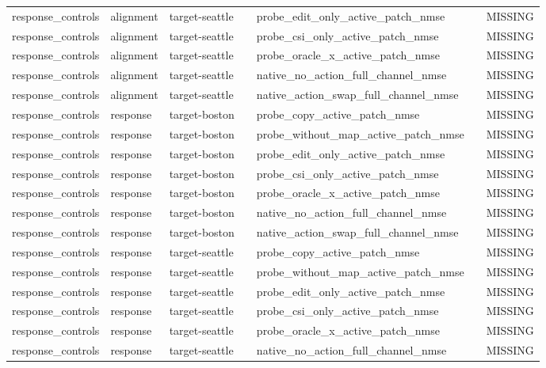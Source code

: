 \begin{longtable}{lllllll}
response\_controls & alignment & target-seattle &  & probe\_edit\_only\_active\_patch\_nmse &  & MISSING \\
response\_controls & alignment & target-seattle &  & probe\_csi\_only\_active\_patch\_nmse &  & MISSING \\
response\_controls & alignment & target-seattle &  & probe\_oracle\_x\_active\_patch\_nmse &  & MISSING \\
response\_controls & alignment & target-seattle &  & native\_no\_action\_full\_channel\_nmse &  & MISSING \\
response\_controls & alignment & target-seattle &  & native\_action\_swap\_full\_channel\_nmse &  & MISSING \\
response\_controls & response & target-boston &  & probe\_copy\_active\_patch\_nmse &  & MISSING \\
response\_controls & response & target-boston &  & probe\_without\_map\_active\_patch\_nmse &  & MISSING \\
response\_controls & response & target-boston &  & probe\_edit\_only\_active\_patch\_nmse &  & MISSING \\
response\_controls & response & target-boston &  & probe\_csi\_only\_active\_patch\_nmse &  & MISSING \\
response\_controls & response & target-boston &  & probe\_oracle\_x\_active\_patch\_nmse &  & MISSING \\
response\_controls & response & target-boston &  & native\_no\_action\_full\_channel\_nmse &  & MISSING \\
response\_controls & response & target-boston &  & native\_action\_swap\_full\_channel\_nmse &  & MISSING \\
response\_controls & response & target-seattle &  & probe\_copy\_active\_patch\_nmse &  & MISSING \\
response\_controls & response & target-seattle &  & probe\_without\_map\_active\_patch\_nmse &  & MISSING \\
response\_controls & response & target-seattle &  & probe\_edit\_only\_active\_patch\_nmse &  & MISSING \\
response\_controls & response & target-seattle &  & probe\_csi\_only\_active\_patch\_nmse &  & MISSING \\
response\_controls & response & target-seattle &  & probe\_oracle\_x\_active\_patch\_nmse &  & MISSING \\
response\_controls & response & target-seattle &  & native\_no\_action\_full\_channel\_nmse &  & MISSING \\

\end{longtable}
